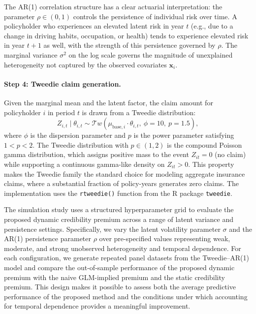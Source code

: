 \documentclass{sfuthesis}
\numberwithin{equation}{chapter}
\begin{document}
The AR(1) correlation structure has a clear actuarial interpretation: the parameter $\rho \in (0, 1)$ controls the persistence of individual risk over time. A policyholder who experiences an elevated latent risk in year $t$ (e.g., due to a change in driving habits, occupation, or health) tends to experience elevated risk in year $t+1$ as well, with the strength of this persistence governed by $\rho$. The marginal variance $\sigma^2$ on the log scale governs the magnitude of unexplained heterogeneity not captured by the observed covariates $\bm{x}_i$.

\paragraph{Step 4: Tweedie claim generation.}
Given the marginal mean and the latent factor, the claim amount for policyholder $i$ in period $t$ is drawn from a Tweedie distribution:
\begin{equation}
Z_{i,t} \mid \theta_{i,t} \sim \mathcal{T}w\!\left(\mu_{\text{base}, i} \cdot \theta_{i,t},\ \phi=10,\ p=1.5\right),
\label{eq:tweedie-gen}
\end{equation}
where $\phi$ is the dispersion parameter and $p$ is the power parameter satisfying $1 < p < 2$. The Tweedie distribution with $p \in (1, 2)$ is the compound Poisson gamma distribution, which assigns positive mass to the event $Z_{it} = 0$ (no claim) while supporting a continuous gamma-like density on $Z_{it} > 0$. This property makes the Tweedie family the standard choice for modeling aggregate insurance claims, where a substantial fraction of policy-years generates zero claims. The implementation uses the \texttt{rtweedie()} function from the R package \texttt{tweedie}. 

The simulation study uses a structured hyperparameter grid to evaluate the proposed dynamic credibility premium across a range of latent variance and persistence settings. Specifically, we vary the latent volatility parameter \(\sigma\) and the AR(1) persistence parameter \(\rho\) over pre-specified values representing weak, moderate, and strong unobserved heterogeneity and temporal dependence. For each configuration, we generate repeated panel datasets from the Tweedie--AR(1) model and compare the out-of-sample performance of the proposed dynamic premium with the naive GLM-implied premium and the static credibility premium. This design makes it possible to assess both the average predictive performance of the proposed method and the conditions under which accounting for temporal dependence provides a meaningful improvement.
\end{document}
